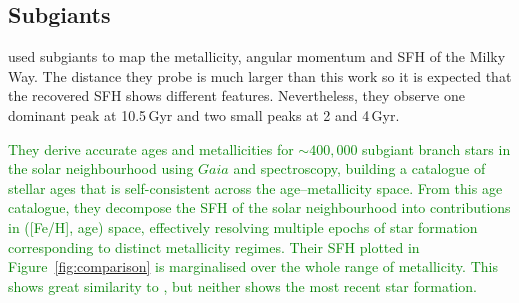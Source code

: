 \documentclass[fleqn,usenatbib]{mnras}
\begin{document}
\subsection{Subgiants}
\citet{2022Natur.603..599X} used subgiants to map the metallicity, angular
momentum and SFH of the Milky Way. The distance they probe is much larger
than this work so it is expected that the recovered SFH shows different
features. Nevertheless, they observe one dominant peak at 10.5\,Gyr and two
small peaks at 2 and 4\,Gyr.

\textcolor{green}{\citet{2024ApJ...976...87N}
They derive accurate ages and metallicities for $\sim$$400,000$ subgiant branch
stars in the solar neighbourhood using $Gaia$ and spectroscopy, building a
catalogue of stellar ages that is self-consistent across the age–metallicity
space. From this age catalogue, they decompose the SFH of the solar
neighbourhood into contributions in ([Fe/H], age) space, effectively resolving
multiple epochs of star formation corresponding to distinct metallicity regimes.
Their SFH plotted in Figure~\ref{fig:comparison} is marginalised over the
whole range of metallicity. This shows great similarity to
\citet{2022Natur.603..599X}, but neither shows the most recent star formation.
}
\end{document}
